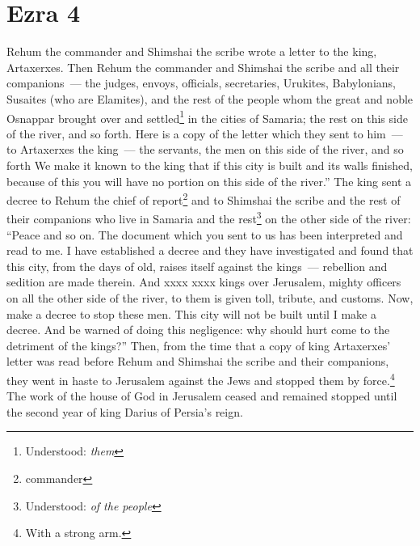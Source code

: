 \section{Ezra 4}\label{Ezra 4}
\begin{enumerate}[align=center]
     Rehum the commander and Shimshai the scribe wrote a letter to the king, Artaxerxes.%
     Then Rehum the commander and Shimshai the scribe and all their companions~--- the judges, envoys, officials, secretaries, Urukites, Babylonians, Susaites (who are Elamites),%
     and the rest of the people whom the great and noble Osnappar brought over and settled\footnote{Understood: \emph{them}} in the cities of Samaria; the rest on this side of the river, and so forth.%
     Here is a copy of the letter which they sent to him~--- to Artaxerxes the king~--- the servants, the men on this side of the river, and so forth%
     We make it known to the king that if this city is built and its walls finished, because of this you will have no portion on this side of the river.''%
     The king sent a decree to Rehum the chief of report\footnote{commander} and to Shimshai the scribe and the rest of their companions who live in Samaria and the rest\footnote{Understood: \emph{of the people}} on the other side of the river: ``Peace and so on.%
     The document which you sent to us has been interpreted and read to me.%
     I have established a decree and they have investigated and found that this city, from the days of old, raises itself against the kings~--- rebellion and sedition are made therein.%
     And xxxx xxxx kings over Jerusalem, mighty officers on all the other side of the river, to them is given toll, tribute, and customs.%
     Now, make a decree to stop these men. This city will not be built until I make a decree.%
     And be warned of doing this negligence: why should hurt come to the detriment of the kings?''%
     Then, from the time that a copy of king Artaxerxes' letter was read before Rehum and Shimshai the scribe and their companions, they went in haste to Jerusalem against the Jews and stopped them by force.\footnote{With a strong arm.}%
     The work of the house of God in Jerusalem ceased and remained stopped until the second year of king Darius of Persia's reign.%
\end{enumerate}
